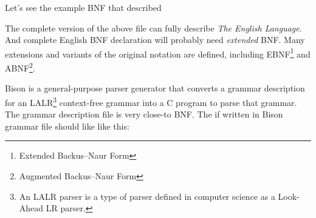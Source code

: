 Let's see the example BNF that described  

The complete version of the above file can fully describe \emph{The English Language}. 
And complete English BNF declaration will probably need \emph{extended} BNF. 
Many \mbox{extensions} and variants of the original notation are defined, including EBNF\footnote{Extended Backus--Naur Form} and ABNF\footnote{Augmented Backus--Naur Form}.

Bison\cite{bison} is a general-purpose parser generator that converts a grammar description for an LALR\footnote{An LALR parser is a type of parser defined in computer science as a Look-Ahead LR parser.} context-free grammar into a C program to parse that grammar.
The grammar description file is very close-to BNF. The    if written in Bison grammar file should like like this:

\renewcommand{\arraystretch}{1}

